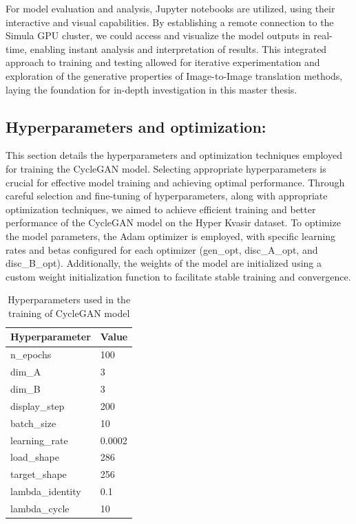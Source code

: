 \documentclass[UKenglish,12pt]{master-style}
\begin{document}
For model evaluation and analysis, Jupyter notebooks are utilized, using their interactive and visual capabilities. By establishing a remote connection to the Simula GPU cluster, we could access and visualize the model outputs in real-time, enabling instant analysis and interpretation of results. This integrated approach to training and testing allowed for iterative experimentation and exploration of the generative properties of Image-to-Image translation methods, laying the foundation for in-depth investigation in this master thesis.

\subsection{Hyperparameters and optimization:}

This section details the hyperparameters and optimization techniques employed for training the CycleGAN model. Selecting appropriate hyperparameters is crucial for effective model training and achieving optimal performance. Through careful selection and fine-tuning of hyperparameters, along with appropriate optimization techniques, we aimed to achieve efficient training and better performance of the CycleGAN model on the Hyper Kvasir dataset. To optimize the model parameters, the Adam optimizer is employed, with specific learning rates and betas configured for each optimizer (gen\_opt, disc\_A\_opt, and disc\_B\_opt). Additionally, the weights of the model are initialized using a custom weight initialization function to facilitate stable training and convergence. 

\begin{table}[ht]
\centering
\caption{Hyperparameters used in the training of CycleGAN model}
\begin{tabular}{|l|l|}
\hline
\textbf{Hyperparameter} & \textbf{Value} \\ \hline
n\_epochs                & 100            \\ \hline
dim\_A                   & 3              \\ \hline
dim\_B                   & 3              \\ \hline
display\_step            & 200            \\ \hline
batch\_size              & 10             \\ \hline
learning\_rate           & 0.0002         \\ \hline
load\_shape              & 286            \\ \hline
target\_shape            & 256            \\ \hline
lambda\_identity         & 0.1            \\ \hline
lambda\_cycle            & 10             \\ \hline
\end{tabular}
\label{tab:Model_Hyperparameters}
\end{table}
\end{document}
